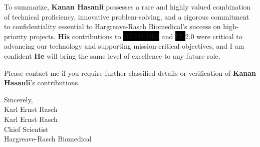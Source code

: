 \documentclass[a4paper,1pt]{letter}
\begin{document}
\begin{letter}{}
To summarize, \textbf{Kanan Hasanli} possesses a rare and highly valued combination of technical proficiency, innovative problem-solving, and a rigorous commitment to confidentiality essential to Hargreave-Rasch Biomedical’s success on high-priority projects. \textbf{His} contributions to \colorbox{black}{OVER DID} and \colorbox{black}{  IT   } 2.0 were critical to advancing our technology and supporting mission-critical objectives, and I am confident \textbf{He} will bring the same level of excellence to any future role.

Please contact me if you require further classified details or verification of \textbf{Kanan Hasanli}'s contributions.
\vspace{1.2 cm}
\closing{Sincerely, \\ [2ex]
{\color{blue}\fontsize{30pt}{16.8pt}\selectfont Karl Ernst Rasch} \\ [2ex]
Karl Ernst Rasch \\ Chief Scientist \\ Hargreave-Rasch Biomedical}
\end{letter}
\end{document}
